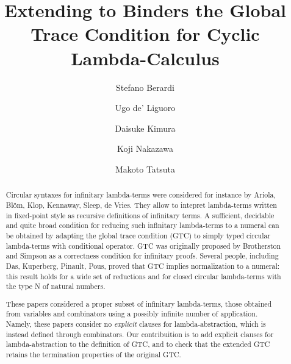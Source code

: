 \documentclass[a4paper]{lipics-v2021}
\title{Extending to Binders the Global Trace Condition for Cyclic Lambda-Calculus}
\author
    {Stefano Berardi}
    {Computer Science Department, Turin University, Torino, Italy}
    {} %
    {} %
    {} %
\author
    {Ugo de' Liguoro}
    {Computer Science Department, Turin University, Torino, Italy}
    {} %
    {} %
    {} %
\author
    {Daisuke Kimura}
    {Department of Information Science, Toho University, Japan}
    {} %
    {} %
    {} %
\author
    {Koji Nakazawa}
    {Graduate School of Informatics, Nagoya University, Japan}
    {} %
    {} %
    {} %
\author
    {Makoto Tatsuta}
    {National Institute of Informatics/Sokendai, Tokyo, Japan}
    {} %
    {} %
    {} %
\begin{document}
\maketitle

\begin{abstract}
Circular syntaxes for infinitary lambda-terms
were considered for instance by Ariola, Bl\"{o}m, Klop, Kennaway, Sleep, de Vries.
They allow to intepret lambda-terms written in fixed-point style 
as recursive definitions of infinitary terms. 
A sufficient, decidable and quite broad condition for reducing such 
infinitary lambda-terms to a numeral can be obtained
by adapting the global trace condition (GTC) to simply typed 
circular lambda-terms with conditional operator. 
GTC was originally proposed by Brotherston and Simpson
as a correctness condition for infinitary proofs.
Several people, including Das, Kuperberg, Pinault, Pous,
proved that GTC implies normalization to a numeral:
this result holds for a wide set of reductions and for closed circular lambda-terms 
with the type N of natural numbers. 

These papers considered a proper subset of infinitary lambda-terms, those
obtained from variables and combinators using a possibly infinite number of application.
Namely, these papers consider no \emph{explicit} clauses for lambda-abstraction,
which is instead defined through combinators.
Our contribuition is to add explicit clauses for lambda-abstraction
to the definition of GTC, and to check that 
the extended GTC retains the termination properties of the original GTC. 
\end{abstract}




























\end{document}
